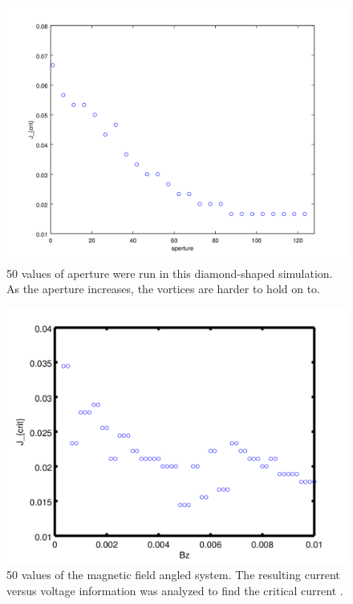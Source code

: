 \begin{figure}[htbp]
\begin{center}
\includegraphics[scale=.50]{emptyDiamondScan.png}
\caption{ 50 values of aperture were run in this diamond-shaped simulation. As the aperture increases, the vortices are harder to hold on to.}
\label{emptyDiamondScan}
\end{center}
\end{figure}



\begin{figure}[htbp]
\begin{center}
\includegraphics[scale=.50]{2DAngleBz.png}
\caption{ 50 values of the magnetic field angled system. The resulting current versus voltage information was analyzed to find the critical current .  }
\label{angleBz}
\end{center}
\end{figure}


